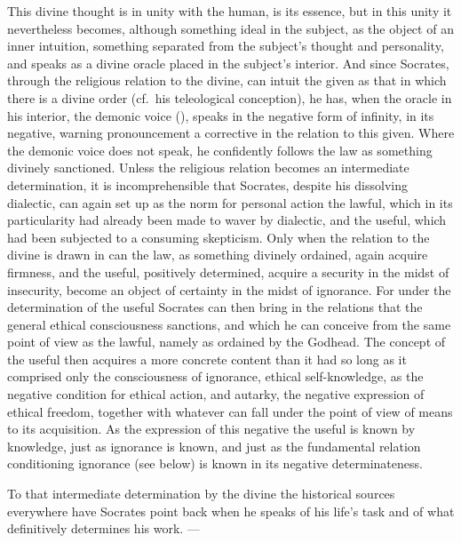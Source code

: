 This divine thought is in unity with the human, is its essence,
but in this unity it nevertheless becomes, although something ideal in the subject, as the object of an inner intuition, something separated from the subject's thought and personality, and speaks as a divine oracle placed in the subject's interior. And since
Socrates, through the religious relation to the divine,
can intuit the given as that in which there is a divine
order (cf.\ his teleological conception), he has, when
the oracle in his interior, the demonic voice (),
speaks in the negative form of infinity, in its negative, warning pronouncement a corrective in the relation to this given. Where
the demonic voice does not speak, he confidently follows the law
as something divinely sanctioned. Unless the religious
relation becomes an intermediate determination, it is incomprehensible that Socrates, despite his dissolving dialectic, can again set up as the norm for
personal action the lawful, which in its particularity had already been made to waver by dialectic, and
the useful, which had been subjected to a consuming skepticism. Only
when the relation to the divine is drawn in can
the law, as something divinely ordained, again acquire firmness,
and the useful, positively determined, acquire a security in the midst of
insecurity, become an object of certainty in the midst of ignorance. For under the determination of the useful
Socrates can then bring in the relations that the general ethical
consciousness sanctions, and which he can conceive from the same
point of view as the lawful, namely as ordained by
the Godhead. The concept of the useful then acquires a more concrete content than it had so long as it comprised only the
consciousness of ignorance, ethical self-knowledge, as the negative condition for ethical action, and autarky, the negative expression of ethical
freedom, together with whatever can fall under
the point of view of means to its acquisition. As the expression of
this negative the useful is known by knowledge, just as ignorance is known, and just as the fundamental relation conditioning ignorance (see below) is known in its negative determinateness.

To that intermediate determination by the divine the
historical sources everywhere have Socrates point back when he speaks
of his life's task and of what definitively determines his
work. ---

